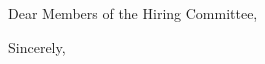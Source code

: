 \documentclass[11pt,a4paper,sans]{moderncv}
\begin{document}
\date{\today}
\opening{Dear Members of the Hiring Committee,}
\makelettertitle

\begin{justify}



\end{justify}

\vspace{0.3cm}
{Sincerely,\\
[Your Full Name, Degree]\\
[Your Current Title]\\
[Your Current Institution]}
\end{document}
